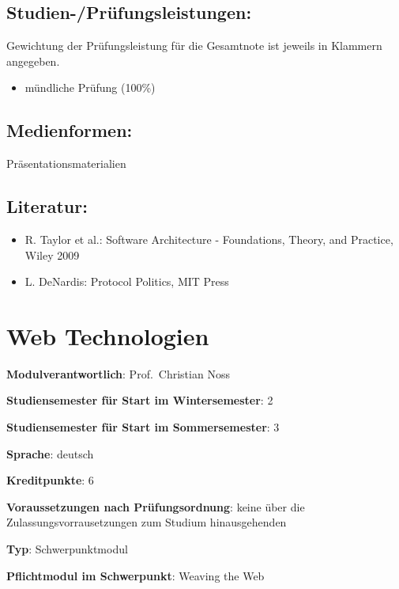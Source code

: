\section*{Studien-/Prüfungsleistungen:}\label{studien-pruxfcfungsleistungen-22}

Gewichtung der Prüfungsleistung für die Gesamtnote ist jeweils in
Klammern angegeben.

\begin{itemize}
\tightlist
\item
  mündliche Prüfung (100\%)
\end{itemize}

\section*{Medienformen:}\label{medienformen-22}

Präsentationsmaterialien

\section*{Literatur:}\label{literatur-22}

\begin{itemize}
\tightlist
\item
  R. Taylor et al.: Software Architecture - Foundations, Theory, and
  Practice, Wiley 2009
\item
  L. DeNardis: Protocol Politics, MIT Press
\end{itemize}

\chapter{Web Technologien}\label{web-technologien}

\begin{modulHead}
\textbf{Modulverantwortlich}: Prof.~Christian
Noss
\end{modulHead}
\begin{modulHead}
\textbf{Studiensemester für
Start im Wintersemester}:
2
\end{modulHead}
\begin{modulHead}
\textbf{Studiensemester für Start
im Sommersemester}:
3
\end{modulHead}
\begin{modulHead}
\textbf{Sprache}:
deutsch
\end{modulHead}
\begin{modulHead}
\textbf{Kreditpunkte}:
6
\end{modulHead}
\begin{modulHead}
\textbf{Voraussetzungen nach
Prüfungsordnung}: keine über die Zulassungsvorrausetzungen zum Studium
hinausgehenden
\end{modulHead}
\begin{modulHead}
\textbf{Typ}:
Schwerpunktmodul
\end{modulHead}
\begin{modulHead}
\textbf{Pflichtmodul
im Schwerpunkt}: Weaving the Web
\end{modulHead}


